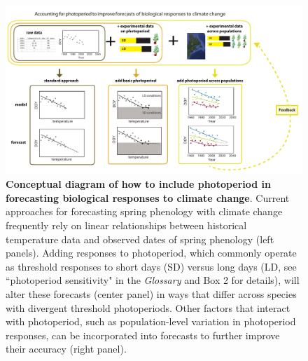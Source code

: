 \documentclass{article}
\begin{document}
 
 

\begin{figure}[p]
\includegraphics{..//..//analyses/photoperiod/figures/photocondiag6.pdf} 
\caption{\textbf{Conceptual diagram of how to include photoperiod in forecasting biological responses to climate change}. Current approaches for forecasting spring phenology with climate change frequently rely on linear relationships between historical temperature data and observed dates of spring phenology (left panels). Adding responses to photoperiod, which commonly operate as threshold responses to short days (SD) versus long days (LD, see ``photoperiod sensitivity" in the \emph{Glossary} and Box 2 for details), will alter these forecasts (center panel) in ways that differ across species with divergent threshold photoperiods. Other factors that interact with photoperiod, such as population-level variation in photoperiod responses, can be incorporated into forecasts to further improve their accuracy (right panel).}
 \label{fig:condiag}
 \end{figure}
 




\end{document}

